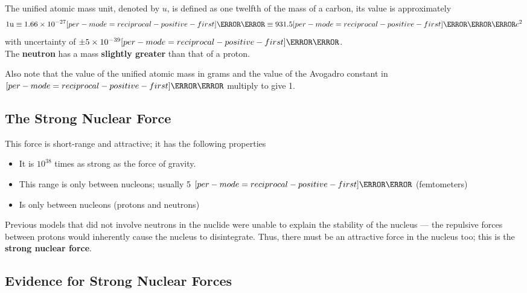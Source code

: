 \documentclass[a4paper,12pt]{article}
\let\oldsi\si
\renewcommand{\si}[1]{\oldsi[per-mode=reciprocal-positive-first]{#1}}
\newcommand{\lb}{\\[8pt]}
\begin{document}
The unified atomic mass unit, denoted by $u$, is defined as one twelfth of the mass of a carbon, its value is approximately $$1\mathrm{u} \equiv 1.66 \times 10^{-27} \si{\kilo\gram} \equiv 931.5 \si{\mega\electronvolt\per c^2}$$
with uncertainty of $\pm 5\times 10^{-39} \si{\kilo\gram}$.\lb
The \textbf{neutron} has a mass \textbf{slightly greater} than that of a proton.

Also note that the value of the unified atomic mass in grams and the value of the Avogadro constant in $\si{\per\mol}$ multiply to give 1.

\subsection{The Strong Nuclear Force}

This force is short-range and attractive; it has the following properties
\begin{itemize}
  \item It is $10^{38}$ times as strong as the force of gravity.
  \item This range is only between nucleons; usually 5 $\si{\femto\m}$ (femtometers)
  \item Is only between nucleons (protons and neutrons)
\end{itemize}

Previous models that did not involve neutrons in the nuclide were unable to explain the stability of the nucleus --- the repulsive forces between protons would inherently cause the nucleus to disintegrate. Thus, there must be an attractive force in the nucleus too; this is the \textbf{strong nuclear force}.

\subsection{Evidence for Strong Nuclear Forces}
\end{document}
